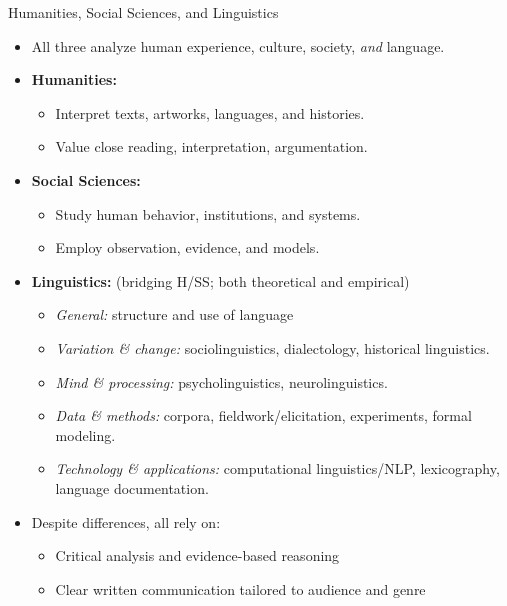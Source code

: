 \documentclass[aspectratio=169]{beamer}
\begin{document}
\begin{frame}{Humanities, Social Sciences, and Linguistics}
\begin{itemize}
  \item All three analyze human experience, culture, society, \emph{and} language.
  \item \textbf{Humanities:}
    \begin{itemize}
      \item Interpret texts, artworks, languages, and histories.
      \item Value close reading, interpretation, argumentation.
    \end{itemize}
  \item \textbf{Social Sciences:}
    \begin{itemize}
      \item Study human behavior, institutions, and systems.
      \item Employ observation, evidence, and models.
    \end{itemize}
  \item \textbf{Linguistics:} (bridging H/SS; both theoretical and empirical)
    \begin{itemize}
      \item \emph{General:} structure and use of language
      \item \emph{Variation \& change:} sociolinguistics, dialectology, historical linguistics.
      \item \emph{Mind \& processing:} psycholinguistics, neurolinguistics.
      \item \emph{Data \& methods:} corpora, fieldwork/elicitation, experiments, formal modeling.
      \item \emph{Technology \& applications:} computational linguistics/NLP, lexicography, language documentation.
    \end{itemize}
  \item Despite differences, all rely on:
    \begin{itemize}
      \item Critical analysis and evidence-based reasoning
      \item Clear written communication tailored to audience and genre
    \end{itemize}
\end{itemize}
\end{frame}
\end{document}
